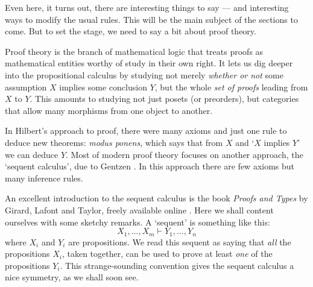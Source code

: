 \documentclass[12pt,twoside,openright]{report}
\newcommand{\lHom}{\vdash}
\begin{document}
Even here, it turns out, there are interesting things to say --- and interesting ways to modify the usual rules.  This will be the main subject of the sections to come.  But to set the stage, we need to say a bit about proof theory.

Proof theory is the branch of mathematical logic that treats proofs as mathematical entities worthy of study in their own right. It lets us dig deeper into the propositional calculus by studying not merely {\it whether or not} some assumption $X$ implies some conclusion $Y$, but the whole {\it set of proofs} leading from $X$ to 
$Y$.  This amounts to studying not just posets (or preorders), but categories that allow many morphisms from one object to another.

In Hilbert's approach to proof, there were many axioms and just one rule to deduce new theorems: {\em modus ponens}, which says that from $X$ 
and `$X$ implies $Y$' we can deduce $Y$.  Most of modern proof theory focuses on another approach, the `sequent calculus', due to Gentzen \cite{Gentzen}.  In this approach there are few axioms but many inference rules.  

An excellent introduction to the sequent calculus is the book 
{\it Proofs and Types} by Girard, Lafont and Taylor, freely available online \cite{GLT}.   Here we shall content ourselves with some sketchy remarks.  A `sequent' is something like this:
\[          X_1, \dots, X_m \lHom Y_1, \dots , Y_n  \]
where $X_i$ and $Y_i$ are propositions.  We read this sequent as saying that {\em all} the propositions $X_i$, taken together, can be used to prove at least {\em one} of the propositions $Y_i$.  This strange-sounding convention gives the sequent calculus a nice symmetry, as we shall soon see.
\end{document}
